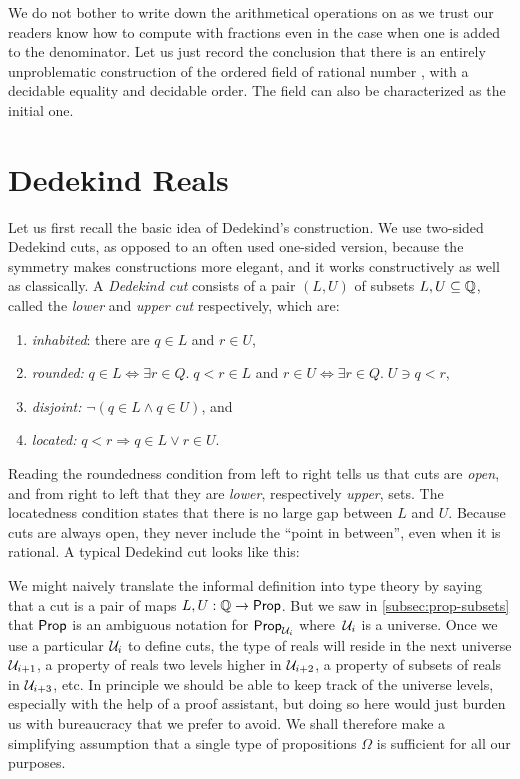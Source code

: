 We do not bother to write down the arithmetical operations on \Q as we trust our readers
know how to compute with fractions even in the case when one is added to the denominator.
Let us just record the conclusion that there is an entirely unproblematic construction of
the ordered field of rational number \Q, with a decidable equality and decidable order.
The field \Q can also be characterized as the initial one.

\section{Dedekind Reals}
\label{sec:dedekind-reals}

Let us first recall the basic idea of Dedekind's construction. We use two-sided Dedekind
cuts, as opposed to an often used one-sided version, because the symmetry makes
constructions more elegant, and it works constructively as well as classically. A
\emph{Dedekind cut} consists of a pair $(L, U)$ of subsets $L, U \subseteq \mathbb{Q}$, called the
\emph{lower} and \emph{upper cut} respectively, which are:
% 
\begin{enumerate}
\item \emph{inhabited}: there are $q \in L$ and $r \in U$,
\item \emph{rounded:} $q \in L \Leftrightarrow \exists r \in Q .\; q < r \in L$
  and $r \in U \Leftrightarrow \exists r \in Q .\; U \ni q < r$,
\item \emph{disjoint:} $\lnot (q \in L \land q \in U)$, and
\item \emph{located:} $q < r \Rightarrow q \in L \lor r \in U$.
\end{enumerate}
%
Reading the roundedness condition from left to right tells us that cuts are \emph{open},
and from right to left that they are \emph{lower}, respectively \emph{upper}, sets. The
locatedness condition states that there is no large gap between $L$ and $U$. Because cuts
are always open, they never include the ``point in between'', even when it is rational. A
typical Dedekind cut looks like this:
%
\begin{center}
\end{center}
%
We might naively translate the informal definition into type theory by saying that a cut
is a pair of maps $L, U : \mathbb{Q} \to \mathsf{Prop}$. But we saw in \autoref{subsec:prop-subsets} that
$\mathsf{Prop}$ is an ambiguous notation for $\mathsf{Prop}_{\mathcal{U}_i}$ where~$\mathcal{U}_i$ is a universe. Once we
use a particular $\mathcal{U}_i$ to define cuts, the type of reals will reside in the next
universe $\mathcal{U}_{i+1}$, a property of reals two levels higher in $\mathcal{U}_{i+2}$, a property of
subsets of reals in $\mathcal{U}_{i+3}$, etc. In principle we should be able to keep track of the
universe levels, especially with the help of a proof assistant, but doing so here would
just burden us with bureaucracy that we prefer to avoid. We shall therefore make a
simplifying assumption that a single type of propositions $\Omega$ is sufficient for all
our purposes.

